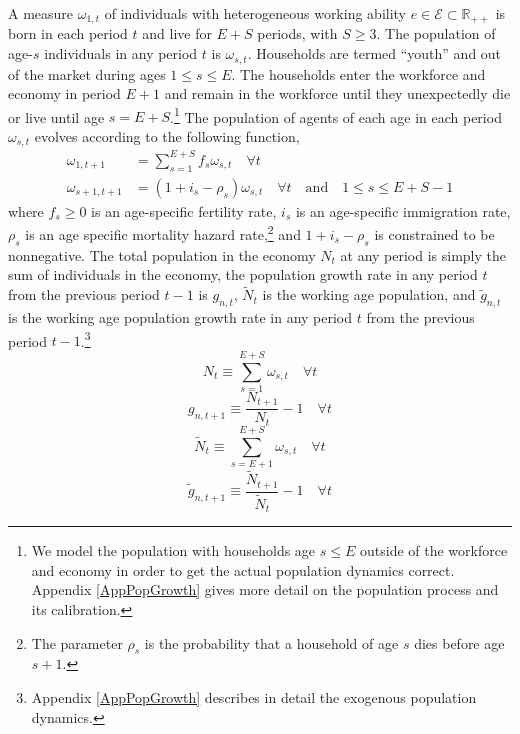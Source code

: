\documentclass[letterpaper,12pt]{article}
\theoremstyle{definition}
\begin{document}
\begin{spacing}{1.5}
    A measure $\omega_{1,t}$ of individuals with heterogeneous working ability $e \in\mathcal{E}\subset\mathbb{R}_{++}$ is born in each period $t$ and live for $E+S$ periods, with $S\geq 3$. The population of age-$s$ individuals in any period $t$ is $\omega_{s,t}$. Households are termed ``youth'' and out of the market during ages $1\leq s\leq E$. The households enter the workforce and economy in period $E+1$ and remain in the workforce until they unexpectedly die or live until age $s=E+S$.\footnote{We model the population with households age $s\leq E$ outside of the workforce and economy in order to get the actual population dynamics correct. Appendix \ref{AppPopGrowth} gives more detail on the population process and its calibration.} The population of agents of each age in each period $\omega_{s,t}$ evolves according to the following function,
    \begin{equation}\label{EqPopLawofmotion}
      \begin{split}
        \omega_{1,t+1} &= \sum_{s=1}^{E+S} f_s\omega_{s,t}\quad\forall t \\
        \omega_{s+1,t+1} &= (1 + i_s - \rho_s)\omega_{s,t}\quad\forall t\quad\text{and}\quad 1\leq s \leq E+S-1
      \end{split}
    \end{equation}
    where $f_s\geq 0$ is an age-specific fertility rate, $i_s$ is an age-specific immigration rate, $\rho_s$ is an age specific mortality hazard rate,\footnote{The parameter $\rho_s$ is the probability that a household of age $s$ dies before age $s+1$.} and $1+i_s-\rho_s$ is constrained to be nonnegative. The total population in the economy $N_t$ at any period is simply the sum of individuals in the economy, the population growth rate in any period $t$ from the previous period $t-1$ is $g_{n,t}$, $\tilde{N}_t$ is the working age population, and $\tilde{g}_{n,t}$ is the working age population growth rate in any period $t$ from the previous period $t-1$.\footnote{Appendix \ref{AppPopGrowth} describes in detail the exogenous population dynamics.}
    \begin{equation}\label{EqPopDef}
      N_t\equiv\sum_{s=1}^{E+S} \omega_{s,t} \quad\forall t
    \end{equation}
    \begin{equation}\label{EqPopGrowth}
      g_{n,t+1} \equiv \frac{N_{t+1}}{N_t} - 1 \quad\forall t
    \end{equation}
    \begin{equation}\label{EqPopWkDef}
      \tilde{N}_t\equiv\sum_{s=E+1}^{E+S} \omega_{s,t} \quad\forall t
    \end{equation}
    \begin{equation}\label{EqPopWkGrowth}
      \tilde{g}_{n,t+1} \equiv \frac{\tilde{N}_{t+1}}{\tilde{N}_t} - 1 \quad\forall t
    \end{equation}


\end{spacing}
\end{document}
